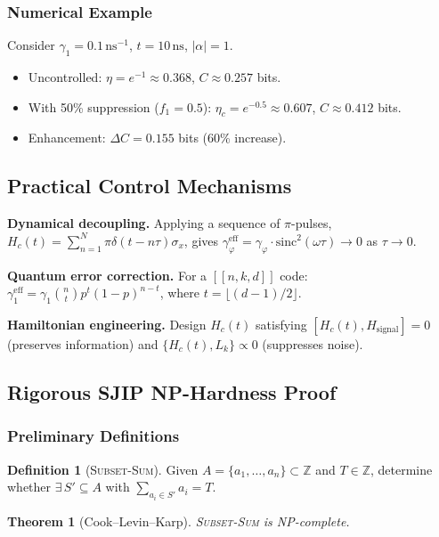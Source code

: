 \documentclass[journal,twocolumn]{IEEEtran}
\theoremstyle{definition}
\newtheorem{definition}{Definition}[section]
\theoremstyle{plain}
\newtheorem{theorem}{Theorem}[section]
\newcommand{\Z}{\mathbb{Z}}
\begin{document}
\subsubsection{Numerical Example}

Consider $\gamma_1=0.1\,\mathrm{ns}^{-1}$, $t=10\,\mathrm{ns}$,
$|\alpha|=1$.
\begin{itemize}[leftmargin=*, itemsep=2pt]
  \item Uncontrolled: $\eta=e^{-1}\approx0.368$,
    $C\approx0.257$ bits.
  \item With 50\% suppression ($f_1=0.5$):
    $\eta_c=e^{-0.5}\approx0.607$, $C\approx0.412$ bits.
  \item Enhancement: $\Delta C=0.155$ bits (60\% increase).
\end{itemize}

\subsection{Practical Control Mechanisms}

\textbf{Dynamical decoupling.} Applying a sequence of $\pi$-pulses,
$H_c(t)=\sum_{n=1}^N\pi\delta(t-n\tau)\sigma_x$, gives
$\gamma_\varphi^{\mathrm{eff}}=\gamma_\varphi\cdot\mathrm{sinc}^2(\omega\tau)\to0$
as $\tau\to0$.

\textbf{Quantum error correction.} For a $[[n,k,d]]$ code:
$\gamma_1^{\mathrm{eff}}=\gamma_1\binom{n}{t}p^t(1-p)^{n-t}$,
where $t=\lfloor(d-1)/2\rfloor$.

\textbf{Hamiltonian engineering.} Design $H_c(t)$ satisfying
$[H_c(t),H_{\mathrm{signal}}]=0$ (preserves information) and
$\{H_c(t),L_k\}\propto0$ (suppresses noise).

\subsection{Rigorous SJIP NP-Hardness Proof}
\label{sec:sjip_proof}

\subsubsection{Preliminary Definitions}

\begin{definition}[\textsc{Subset-Sum}]
Given $A=\{a_1,\dots,a_n\}\subset\Z$ and $T\in\Z$, determine whether
$\exists\,S'\subseteq A$ with $\sum_{a_i\in S'}a_i=T$.
\end{definition}

\begin{theorem}[Cook--Levin--Karp]
\textsc{Subset-Sum} is NP-complete.
\end{theorem}
\end{document}
